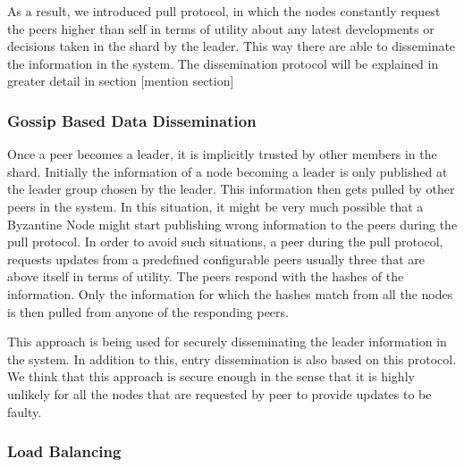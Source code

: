 \documentclass[a4paper, 11pt]{article}
\begin{document}
As a result, we introduced pull protocol, in which the nodes constantly request the peers higher than self in terms of utility about any latest developments or decisions taken in the shard by the leader. This way there are able to disseminate the information in the system. The dissemination protocol will be explained in greater detail in section [mention section]



\subsubsection*{Gossip Based Data Dissemination}
Once a peer becomes a leader, it is implicitly trusted by other members in the shard.
Initially the information of a node becoming a leader is only published at the leader group chosen by the leader. This information then gets pulled by other peers in the system. In this situation, it might be very much possible that a Byzantine Node might start publishing wrong information to the peers during the pull protocol. In order to avoid such situations, a peer during the pull protocol, requests updates from a predefined configurable peers usually three that are above itself in terms of utility.  The peers respond with the hashes of the information. Only the information for which the hashes match from all the nodes is then pulled from anyone of the responding peers. 
\par This approach is being used for securely disseminating the leader information in the system. In addition to this, entry dissemination is also based on this protocol. We think that this approach is secure enough in the sense that it is highly unlikely for all the nodes that are requested by peer to provide updates to be faulty.


\subsubsection*{Load Balancing}
\end{document}
